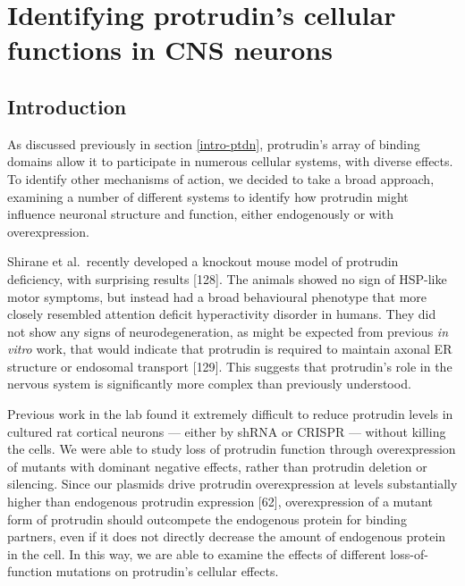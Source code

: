 \documentclass[
  12pt,
  a4paper,
]{book}
\renewcommand{\chaptermark}[1]{\markboth{#1}{}}
\begin{document}
\hypertarget{identifying-protrudins-cellular-functions-in-cns-neurons}{%
\chapter{Identifying protrudin's cellular functions in CNS neurons}\label{identifying-protrudins-cellular-functions-in-cns-neurons}}

\chaptermark{Cellular functions of protrudin}

\hypertarget{introduction-1}{%
\section{Introduction}\label{introduction-1}}

As discussed previously in section \ref{intro-ptdn}, protrudin's array of binding domains allow it to participate in numerous cellular systems, with diverse effects. To identify other mechanisms of action, we decided to take a broad approach, examining a number of different systems to identify how protrudin might influence neuronal structure and function, either endogenously or with overexpression.

Shirane et al.~recently developed a knockout mouse model of protrudin deficiency, with surprising results {[}128{]}. The animals showed no sign of HSP-like motor symptoms, but instead had a broad behavioural phenotype that more closely resembled attention deficit hyperactivity disorder in humans. They did not show any signs of neurodegeneration, as might be expected from previous \emph{in vitro} work, that would indicate that protrudin is required to maintain axonal ER structure or endosomal transport {[}129{]}. This suggests that protrudin's role in the nervous system is significantly more complex than previously understood.

Previous work in the lab found it extremely difficult to reduce protrudin levels in cultured rat cortical neurons --- either by shRNA or CRISPR --- without killing the cells. We were able to study loss of protrudin function through overexpression of mutants with dominant negative effects, rather than protrudin deletion or silencing. Since our plasmids drive protrudin overexpression at levels substantially higher than endogenous protrudin expression {[}62{]}, overexpression of a mutant form of protrudin should outcompete the endogenous protein for binding partners, even if it does not directly decrease the amount of endogenous protein in the cell. In this way, we are able to examine the effects of different loss-of-function mutations on protrudin's cellular effects.
\end{document}
